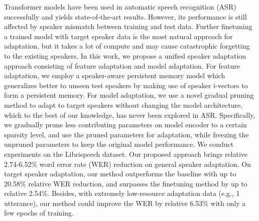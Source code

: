 Transformer models have been used in automatic speech recognition (ASR) successfully and yields state-of-the-art results. However, its performance is still affected by speaker mismatch between training and test data. Further finetuning a trained model with target speaker data is the most natural approach for adaptation, but it takes a lot of compute and may cause catastrophic forgetting to the existing speakers. In this work, we propose a unified speaker adaptation approach consisting of feature adaptation and model adaptation. For feature adaptation, we employ a speaker-aware persistent memory model which generalizes better to unseen test speakers by making use of speaker i-vectors to form a persistent memory. For model adaptation, we use a novel gradual pruning method to adapt to target speakers without changing the model architecture, which to the best of our knowledge, has never been explored in ASR. Specifically, we gradually prune less contributing parameters on model encoder to a certain sparsity level, and use the pruned parameters for adaptation, while freezing the unpruned parameters to keep the original model performance. We conduct experiments on the Librispeech dataset. Our proposed approach brings relative 2.74-6.52\% word error rate (WER) reduction on general speaker adaptation. On target speaker adaptation, our method outperforms the baseline with up to 20.58\% relative WER reduction, and surpasses the finetuning method by up to relative 2.54\%. Besides, with extremely low-resource adaptation data (e.g., 1 utterance), our method could improve the WER by relative 6.53\% with only a few epochs of training.
